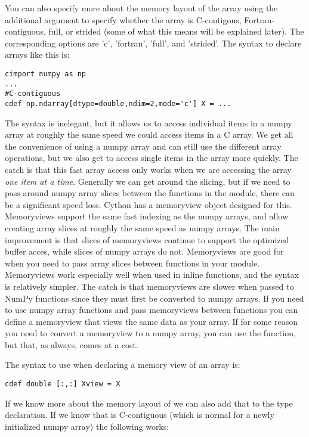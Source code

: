 You can also specify more about the memory layout of the array using the additional argument  to specify whether the array is C-contigous, Fortran-contiguous, full, or strided (some of what this means will be explained later).
The corresponding options are 'c', 'fortran', 'full', and 'strided'.
The syntax to declare arrays like this is:
\begin{lstlisting}
cimport numpy as np
...
#C-contiguous
cdef np.ndarray[dtype=double,ndim=2,mode='c'] X = ...
\end{lstlisting}
The syntax is inelegant, but it allows us to access individual items in a numpy array at roughly the same speed we could access items in a C array.
We get all the convenience of using a numpy array and can still use the different array operations, but we also get to access single items in the array more quickly.
The catch is that this fast array access only works when we are accessing the array \textit{one item at a time}.
Generally we can get around the slicing, but if we need to pass around numpy array slices between the functions in the module, there can be a significant speed loss.
Cython has a memoryview object designed for this.
Memoryviews support the same fast indexing as the numpy arrays, and allow creating array slices at roughly the same speed as numpy arrays.
The main improvement is that slices of memoryviews continue to support the optimized buffer acces, while slices of numpy arrays do not.
Memoryviews are good for when you need to pass array slices between functions in your module.
Memoryviews work especially well when used in inline functions, and the syntax is relatively simpler.
The catch is that memoryviews are slower when passed to NumPy functions since they must first be converted to numpy arrays.
If you need to use numpy array functions and pass memoryviews between functions you can define a memoryview that views the same data as your array.
If for some reason you need to convert a memoryview to a numpy array, you can use the  function, but that, as always, comes at a cost.

The syntax to use when declaring a memory view of an array  is:
\begin{lstlisting}
cdef double [:,:] Xview = X
\end{lstlisting}

If we know more about the memory layout of  we can also add that to the type declaration.
If we know that  is C-contiguous (which is normal for a newly initialized numpy array) the following works:

